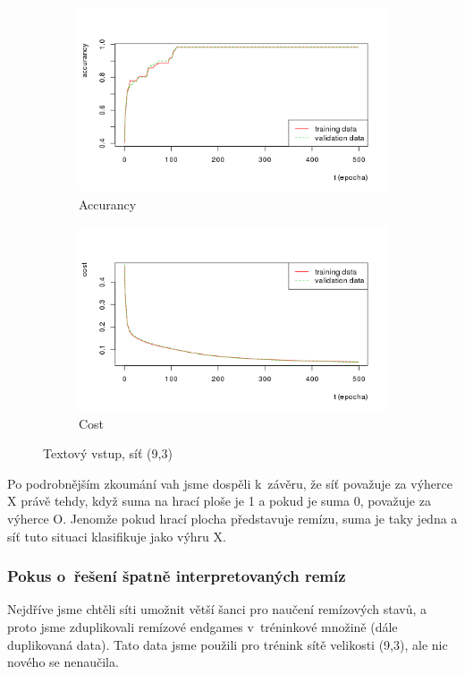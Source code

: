 \documentclass[10pt,a4paper]{article}
\begin{document}
\begin{figure}[h!]
\centering
\begin{subfigure}{.5\textwidth}
  \centering
  \includegraphics[width=\textwidth]{a2}
  \caption{Accurancy}
  \label{fig:a2}
\end{subfigure}%
\begin{subfigure}{.5\textwidth}
  \centering
  \includegraphics[width=\textwidth]{c2}
  \caption{Cost}
  \label{fig:c2}
\end{subfigure}
\caption{Textový vstup, síť (9,3)}
\label{fig:2}
\end{figure}


Po podrobnějším zkoumání vah jsme dospěli k~závěru, že síť považuje za výherce X právě tehdy, když suma na hrací ploše je 1 a pokud je suma 0, považuje za výherce O. Jenomže pokud hrací plocha představuje remízu, suma je taky jedna a síť tuto situaci klasifikuje jako výhru X.

\subsubsection*{Pokus o~řešení špatně interpretovaných remíz}\label{dupl}
Nejdříve jsme chtěli síti umožnit větší šanci pro naučení remízových stavů, a proto jsme zduplikovali remízové endgames v~tréninkové množině (dále duplikovaná data). Tato data jsme použili pro trénink sítě velikosti (9,3), ale nic nového se nenaučila. 
\end{document}
